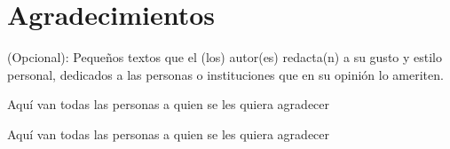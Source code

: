 \chapter*{\large Agradecimientos}



(Opcional): Pequeños textos que el (los) autor(es) redacta(n) a su gusto y estilo personal, dedicados a las personas o instituciones que en su opinión lo ameriten.

\begin{center}
	\bf{\autorUNO}
\end{center}

Aquí van todas las personas a quien se les quiera agradecer

\begin{center}
 	\bf{\autorDOS}
\end{center}

Aquí van todas las personas a quien se les quiera agradecer